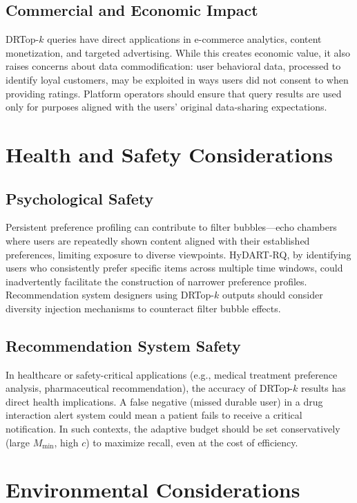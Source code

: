 \subsection{Commercial and Economic Impact}

DRTop-$k$ queries have direct applications in e-commerce analytics, content monetization, and targeted advertising. While this creates economic value, it also raises concerns about data commodification: user behavioral data, processed to identify loyal customers, may be exploited in ways users did not consent to when providing ratings. Platform operators should ensure that query results are used only for purposes aligned with the users' original data-sharing expectations.

\section{Health and Safety Considerations}

\subsection{Psychological Safety}

Persistent preference profiling can contribute to filter bubbles---echo chambers where users are repeatedly shown content aligned with their established preferences, limiting exposure to diverse viewpoints. HyDART-RQ, by identifying users who consistently prefer specific items across multiple time windows, could inadvertently facilitate the construction of narrower preference profiles. Recommendation system designers using DRTop-$k$ outputs should consider diversity injection mechanisms to counteract filter bubble effects.

\subsection{Recommendation System Safety}

In healthcare or safety-critical applications (e.g., medical treatment preference analysis, pharmaceutical recommendation), the accuracy of DRTop-$k$ results has direct health implications. A false negative (missed durable user) in a drug interaction alert system could mean a patient fails to receive a critical notification. In such contexts, the adaptive budget should be set conservatively (large $M_{\min}$, high $c$) to maximize recall, even at the cost of efficiency.

\section{Environmental Considerations}

